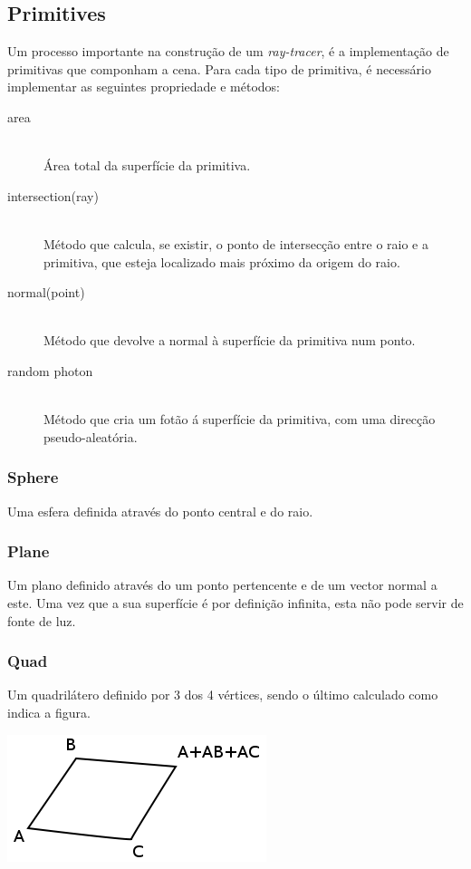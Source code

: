 \documentclass[a4paper]{article}
\begin{document}

\cleardoublepage
\subsection{Primitives}
\indent \indent Um processo importante na construção de um \emph{ray-tracer}, é a implementação de primitivas que componham a cena.
Para cada tipo de primitiva, é necessário implementar as seguintes propriedade e métodos:

\begin{description}
	\item [area] \hfill \\
		Área total da superfície da primitiva.

	\item [intersection(ray)] \hfill \\
		Método que calcula, se existir, o ponto de intersecção entre o raio e a primitiva, que esteja localizado
		mais próximo da origem do raio.

	\item [normal(point)] \hfill \\
		Método que devolve a normal à superfície da primitiva num ponto.

	\item [random photon] \hfill \\
		Método que cria um fotão á superfície da primitiva, com uma direcção pseudo-aleatória.
 
\end{description}

\subsubsection{Sphere}
\indent \indent Uma esfera definida através do ponto central e do raio.   

\subsubsection{Plane}
\indent \indent Um plano definido através do um ponto pertencente e de um vector normal a este.
Uma vez que a sua superfície é por definição infinita, esta não pode servir de fonte de luz.

\subsubsection{Quad}
\indent \indent Um quadrilátero definido por 3 dos 4 vértices, sendo o último calculado como indica a figura.
\begin{center}
	\includegraphics[scale=0.50]{images/quad.png}
	\label{fig:quad}
\end{center}
\end{document}
